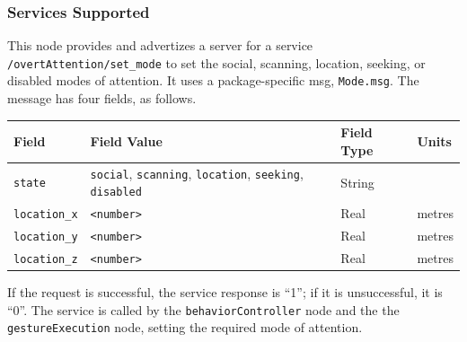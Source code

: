 \documentclass{CSSRforAfrica}
\begin{document}
{{\subsubsection*{Services Supported}
This node  provides and advertizes a server for a service {\small \verb+/overtAttention/set_mode+} to set the social, scanning, location, seeking, or disabled modes of attention.  It uses a package-specific msg, {\small \verb+Mode.msg+}.   The message has four fields, as follows.

\begin{center}
\begin{tabularx}{\linewidth}{| l | X | l| l|}
\hline 
{\small Field }                                  & {\small Field Value}    &  {\small Field Type}  &     {\small Units}   \\
\hline
{\footnotesize  \verb+state+}          & {\footnotesize \verb+social+,  \verb+scanning+, \verb+location+, \verb+seeking+, \verb+disabled+ }  & {\footnotesize String} & \\ 
\hline
{\footnotesize  \verb+location_x+}  & {\footnotesize \verb+<number>+    } & {\footnotesize Real} & {\footnotesize metres} \\ 
\hline
{\footnotesize  \verb+location_y+}  & {\footnotesize \verb+<number>+    } & {\footnotesize Real} & {\footnotesize metres} \\ 
\hline
{\footnotesize  \verb+location_z+}  & {\footnotesize \verb+<number>+    } & {\footnotesize Real} & {\footnotesize metres} \\ 
\hline
\end{tabularx}
\end{center}
If the request is successful, the service response is ``1''; if it is unsuccessful, it is ``0''.  
The service  is called by  the {\small \verb+behaviorController+} node and the the {\small \verb+gestureExecution+} node, setting the required  mode of attention.

}}
\end{document}
